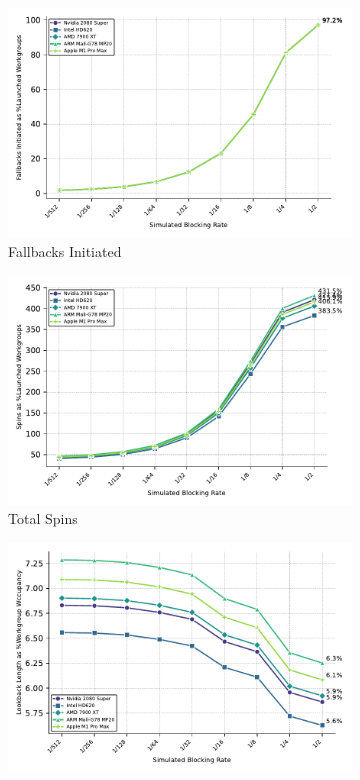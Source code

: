 \documentclass[sigconf]{acmart}
\begin{document}
\begin{figure}[htbp]
  \centering
  \begin{subfigure}{.9\linewidth}
    \centering
    \includegraphics[width=\linewidth]{graphics/fallbacksInitiated_plot.pdf}
    \caption{Fallbacks Initiated}
    \label{fig:fallbacks_initiated}
  \end{subfigure}
  \begin{subfigure}{.9\linewidth}
    \centering
    \includegraphics[width=\linewidth]{graphics/totalSpins_plot.pdf}
    \caption{Total Spins}
    \label{fig:total_spins}
  \end{subfigure}
  \begin{subfigure}{.9\linewidth}
    \centering
    \includegraphics[width=\linewidth]{graphics/lookbackLength_plot.pdf}

\end{subfigure}
\end{figure}
\end{document}
